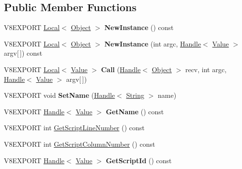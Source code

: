\subsection*{Public Member Functions}
\begin{DoxyCompactItemize}
\item 
\hypertarget{classv8_1_1_function_a7461d71d7a0bf6e510d16200a7c64501}{}V8\+E\+X\+P\+O\+R\+T \hyperlink{classv8_1_1_local}{Local}$<$ \hyperlink{classv8_1_1_object}{Object} $>$ {\bfseries New\+Instance} () const \label{classv8_1_1_function_a7461d71d7a0bf6e510d16200a7c64501}

\item 
\hypertarget{classv8_1_1_function_a8a154fe47d441ae9baaf4e76b2efeadc}{}V8\+E\+X\+P\+O\+R\+T \hyperlink{classv8_1_1_local}{Local}$<$ \hyperlink{classv8_1_1_object}{Object} $>$ {\bfseries New\+Instance} (int argc, \hyperlink{classv8_1_1_handle}{Handle}$<$ \hyperlink{classv8_1_1_value}{Value} $>$ argv\mbox{[}$\,$\mbox{]}) const \label{classv8_1_1_function_a8a154fe47d441ae9baaf4e76b2efeadc}

\item 
\hypertarget{classv8_1_1_function_ac61877494d2d8bb81fcef96003ec4059}{}V8\+E\+X\+P\+O\+R\+T \hyperlink{classv8_1_1_local}{Local}$<$ \hyperlink{classv8_1_1_value}{Value} $>$ {\bfseries Call} (\hyperlink{classv8_1_1_handle}{Handle}$<$ \hyperlink{classv8_1_1_object}{Object} $>$ recv, int argc, \hyperlink{classv8_1_1_handle}{Handle}$<$ \hyperlink{classv8_1_1_value}{Value} $>$ argv\mbox{[}$\,$\mbox{]})\label{classv8_1_1_function_ac61877494d2d8bb81fcef96003ec4059}

\item 
\hypertarget{classv8_1_1_function_ab7abce9df66a4b02f8297c0ab0d5e090}{}V8\+E\+X\+P\+O\+R\+T void {\bfseries Set\+Name} (\hyperlink{classv8_1_1_handle}{Handle}$<$ \hyperlink{classv8_1_1_string}{String} $>$ name)\label{classv8_1_1_function_ab7abce9df66a4b02f8297c0ab0d5e090}

\item 
\hypertarget{classv8_1_1_function_ac8b07c4d3e6079ac8a7fb17c1784f456}{}V8\+E\+X\+P\+O\+R\+T \hyperlink{classv8_1_1_handle}{Handle}$<$ \hyperlink{classv8_1_1_value}{Value} $>$ {\bfseries Get\+Name} () const \label{classv8_1_1_function_ac8b07c4d3e6079ac8a7fb17c1784f456}

\item 
V8\+E\+X\+P\+O\+R\+T int \hyperlink{classv8_1_1_function_a3ae29205851ecbf99ab8ba03559fb849}{Get\+Script\+Line\+Number} () const 
\item 
V8\+E\+X\+P\+O\+R\+T int \hyperlink{classv8_1_1_function_a81c14d8ec5996630ef56c524b19084c2}{Get\+Script\+Column\+Number} () const 
\item 
\hypertarget{classv8_1_1_function_ae2fd80461eebc1896df8b608e90b9236}{}V8\+E\+X\+P\+O\+R\+T \hyperlink{classv8_1_1_handle}{Handle}$<$ \hyperlink{classv8_1_1_value}{Value} $>$ {\bfseries Get\+Script\+Id} () const \label{classv8_1_1_function_ae2fd80461eebc1896df8b608e90b9236}


\end{DoxyCompactItemize}

